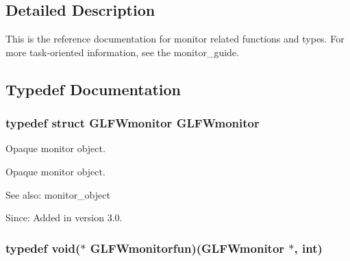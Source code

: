 

\subsection{Detailed Description}
This is the reference documentation for monitor related functions and types. For more task-oriented information, see the monitor\_\-guide. 

\subsection{Typedef Documentation}
\hypertarget{group__monitor_g8d9efd1cde9426692c73fe40437d0ae3}{
\subsubsection[GLFWmonitor]{\setlength{\rightskip}{0pt plus 5cm}typedef struct {\bf GLFWmonitor} {\bf GLFWmonitor}}}
\label{group__monitor_g8d9efd1cde9426692c73fe40437d0ae3}


Opaque monitor object. 

Opaque monitor object.

\begin{Desc}
\item[See also:]monitor\_\-object\end{Desc}
\begin{Desc}
\item[Since:]Added in version 3.0. \end{Desc}
\hypertarget{group__monitor_g67b74af6cecfdbccc7e57a6319a57210}{
\subsubsection[GLFWmonitorfun]{\setlength{\rightskip}{0pt plus 5cm}typedef void($\ast$  {\bf GLFWmonitorfun})({\bf GLFWmonitor} $\ast$, int)}}
\label{group__monitor_g67b74af6cecfdbccc7e57a6319a57210}


